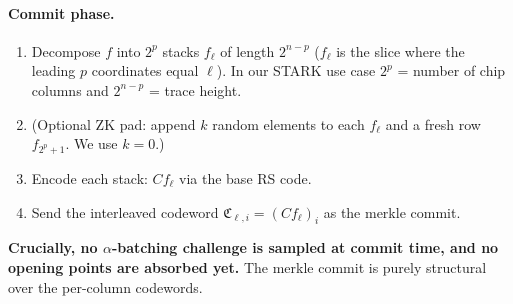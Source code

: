 \paragraph{Commit phase.}
\begin{enumerate}
  \item Decompose $f$ into $2^p$ stacks $f_\ell$ of length
        $2^{n-p}$ ($f_\ell$ is the slice where the leading $p$
        coordinates equal $\ell$).  In our STARK use case
        $2^p$ = number of chip columns and $2^{n-p}$ = trace height.
  \item (Optional ZK pad: append $k$ random elements to each $f_\ell$
        and a fresh row $f_{2^p+1}$.  We use $k=0$.)
  \item Encode each stack: $C f_\ell$ via the base RS code.
  \item Send the interleaved codeword
        $\mathfrak{C}_{\ell,i} = (C f_\ell)_i$ as the merkle commit.
\end{enumerate}

\textbf{Crucially, no $\alpha$-batching challenge is sampled at
commit time, and no opening points are absorbed yet.}  The merkle
commit is purely structural over the per-column codewords.

